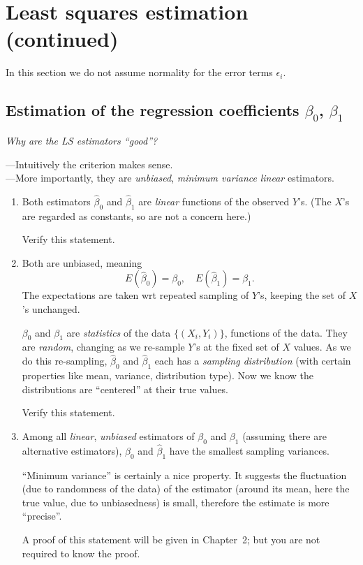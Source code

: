 \documentclass[12pt]{article}
\begin{document}
\section{Least squares estimation (continued)}

In this section we do not assume normality for the error terms
$\epsilon_i$.


\subsection{Estimation of the regression coefficients $\beta_0$, $\beta_1$}

\emph{Why are the LS estimators ``good''?}

---Intuitively the criterion makes sense.\\
---More importantly,
they are \emph{unbiased}, \emph{minimum variance} \emph{linear} estimators.

\begin{enumerate}
\item Both estimators $\hat{\beta}_0$ and $\hat{\beta}_1$ are \emph{linear} functions of the
observed $Y$'s. (The $X$'s are regarded as constants, so are not a
concern here.)

\exercise Verify this statement.

\item Both are unbiased, meaning
\[ E(\hat{\beta}_0) = \beta_0,\quad E(\hat{\beta}_1) = \beta_1. \]
The expectations are taken wrt repeated sampling of $Y$'s, keeping the
set of $X$'s unchanged.

$\beta_0$ and $\beta_1$ are \emph{statistics} of the data $\{(X_i, Y_i)\}$,
\ie functions of the data.
They are \emph{random}, changing as we re-sample $Y$'s at the fixed set
of $X$ values. As we do this re-sampling, $\hat{\beta}_0$ and
$\hat{\beta}_1$ each has a
\emph{sampling distribution} (with certain properties like
mean, variance, distribution type).
Now we know the distributions are ``centered'' at their true values.

\exercise Verify this statement.

\item Among all \emph{linear}, \emph{unbiased} estimators of
$\beta_0$ and $\beta_1$ (assuming there are alternative estimators),
$\hat{\beta}_0$ and $\hat{\beta}_1$ have the smallest sampling variances.

``Minimum variance'' is certainly a nice property. It suggests the
fluctuation (due to randomness of the data)
of the estimator (around its mean, here the true value, due
to unbiasedness) is small, therefore the estimate is more ``precise''.

A proof of this statement will be given in Chapter~2;
but you are not required to know the proof.
\end{enumerate}
\end{document}
